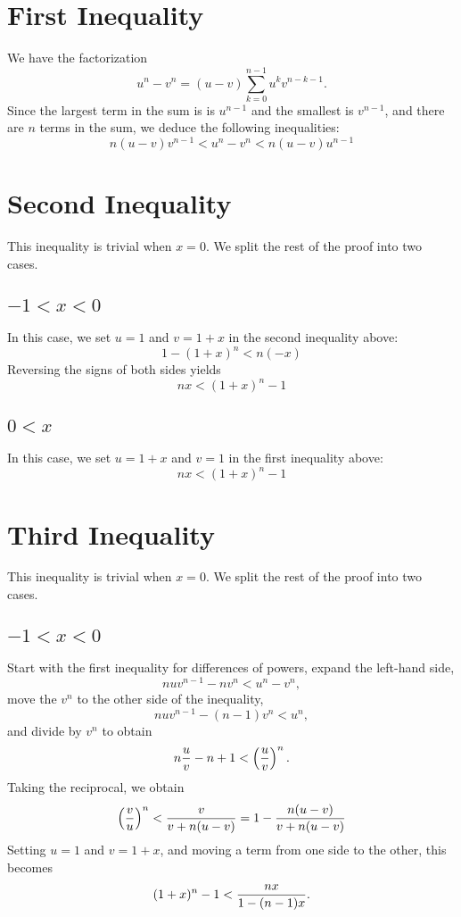 \documentclass[12pt]{article}
\begin{document}
\section{First Inequality}

We have the factorization
\[ u^n - v^n = (u - v) \sum_{k=0}^{n-1} u^k v^{n-k-1}. \]
Since the largest term in the sum is is $u^{n-1}$ and the smallest is
$v^{n-1}$, and there are $n$ terms in the sum, we deduce the following
inequalities: 
\[ n (u-v) v^{n-1} < u^n - v^n < n (u-v) u^{n-1} \]

\section{Second Inequality}

This inequality is trivial when $x = 0$.  We split the rest of 
the proof into two cases.

\subsection{$-1 < x < 0$}

In this case, we set $u = 1$ and $v = 1 + x$ in the second 
inequality above:
\[ 1 - (1 + x)^n < n (-x) \]
Reversing the signs of both sides yields
\[ nx < (1 + x)^n-1  \]

\subsection{$0 < x$}

In this case, we set $u = 1 + x$ and $v = 1$ in the first
inequality above:
\[ nx <  (1 + x)^n -1\]
 
\section{Third Inequality}

This inequality is trivial when $x = 0$.  We split the rest of 
the proof into two cases.

\subsection{$-1 < x < 0$}

Start with the first inequality for differences of powers, expand
the left-hand side,
\[ n u v^{n-1} - n v^n < u^n - v^n, \]
move the $v^n$ to the other side of the inequality,
\[ n u v^{n-1} - (n-1) v^n < u^n, \]
and divide by $v^n$ to obtain
\[ n {u \over v} - n + 1 < \left( {u \over v} \right)^n. \]
Taking the reciprocal, we obtain
\[ \left( {v \over u} \right)^n < {v \over v + n(u - v)} =
1 - {n (u - v) \over v + n(u-v)} \]
Setting $u = 1$ and $v = 1 + x$, and moving a term from one side
to the other, this becomes
\[ (1 + x)^n - 1 < { n x \over 1 - (n - 1) x}. \]
\end{document}
